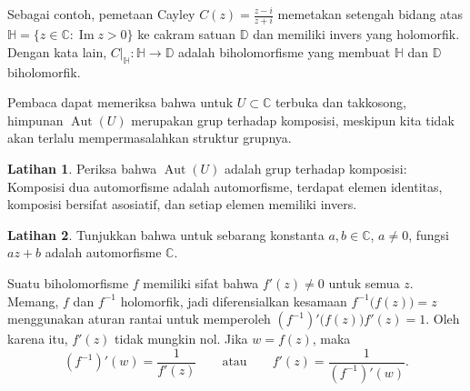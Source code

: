\documentclass[12pt,openany]{book}
\renewcommand{\Im}{\operatorname{Im}}
\newcommand{\Aut}{\operatorname{Aut}}
\newcommand{\C}{{\mathbb{C}}}
\newcommand{\D}{{\mathbb{D}}}
\newcommand{\bH}{{\mathbb{H}}}
\theoremstyle{plain}
\theoremstyle{remark}
\theoremstyle{definition}
\newenvironment{exbox}{%
    \def\FrameCommand{\vrule width 1pt \relax\hspace{10pt}}%
    \MakeFramed{\advance\hsize-\width\FrameRestore}%
}{%
    \endMakeFramed
}
\theoremstyle{exercise}
\newtheorem{exercise}{Latihan}[section]
\theoremstyle{example}
\begin{document}
Sebagai contoh, pemetaan Cayley
$C(z)
=
\frac{z - i}{z + i}$
memetakan setengah bidang atas
$\bH = \{ z \in \C : \Im z > 0 \}$ ke cakram satuan $\D$ dan
memiliki invers yang holomorfik.
Dengan kata lain, $C|_{\bH} \colon \bH \to \D$ adalah biholomorfisme
yang membuat $\bH$ dan $\D$ biholomorfik.

Pembaca dapat memeriksa bahwa untuk $U \subset \C$ terbuka dan takkosong, himpunan
$\Aut(U)$ merupakan grup terhadap
komposisi, meskipun kita tidak akan terlalu mempermasalahkan struktur
grupnya.

\begin{exbox}
\begin{exercise}
Periksa bahwa
$\Aut(U)$ adalah grup terhadap komposisi:
Komposisi dua automorfisme adalah automorfisme,
terdapat elemen identitas,
komposisi bersifat asosiatif,
dan setiap elemen memiliki invers.
\end{exercise}

\begin{exercise}
Tunjukkan bahwa untuk sebarang konstanta $a,b \in \C$, $a \neq 0$, fungsi
$a z + b$ adalah automorfisme $\C$.
\end{exercise}
\end{exbox}

Suatu biholomorfisme $f$ memiliki sifat bahwa $f'(z) \neq 0$ untuk semua $z$.
Memang,
$f$ dan $f^{-1}$ holomorfik, jadi diferensialkan
kesamaan
$f^{-1}\bigl(f(z)\bigr) = z$ menggunakan aturan rantai untuk memperoleh
$(f^{-1})' \bigl(f(z)\bigr) f'(z) = 1$.  Oleh karena itu, $f'(z)$ tidak mungkin nol.
Jika $w = f(z)$, maka
\begin{equation*}
(f^{-1})'(w) = \frac{1}{f'(z)}
\qquad \text{atau} \qquad
f'(z) =
\frac{1}{(f^{-1})'(w)} .
\end{equation*}
\end{document}
